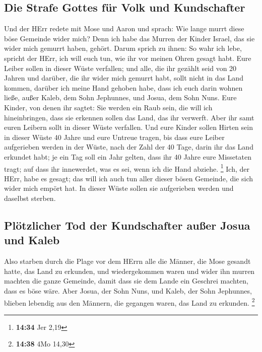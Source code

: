 \hypertarget{die-strafe-gottes-fuxfcr-volk-und-kundschafter}{%
\subsection{Die Strafe Gottes für Volk und
Kundschafter}\label{die-strafe-gottes-fuxfcr-volk-und-kundschafter}}

 Und der HErr redete mit Mose und Aaron und sprach:
 Wie lange murrt diese böse Gemeinde wider mich? Denn ich
habe das Murren der Kinder Israel, das sie wider mich gemurrt haben,
gehört.  Darum sprich zu ihnen: So wahr ich lebe, spricht
der HErr, ich will euch tun, wie ihr vor meinen Ohren gesagt habt.
 Eure Leiber sollen in dieser Wüste verfallen; und alle,
die ihr gezählt seid von 20 Jahren und darüber, die ihr wider mich
gemurrt habt,  sollt nicht in das Land kommen, darüber
ich meine Hand gehoben habe, dass ich euch darin wohnen ließe, außer
Kaleb, dem Sohn Jephunnes, und Josua, dem Sohn Nuns. 
Eure Kinder, von denen ihr sagtet: Sie werden ein Raub sein, die will
ich hineinbringen, dass sie erkennen sollen das Land, das ihr verwerft.
 Aber ihr samt euren Leibern sollt in dieser Wüste
verfallen.  Und eure Kinder sollen Hirten sein in dieser
Wüste 40 Jahre und eure Untreue tragen, bis dass eure Leiber aufgerieben
werden in der Wüste,  nach der Zahl der 40 Tage, darin
ihr das Land erkundet habt; je ein Tag soll ein Jahr gelten, dass ihr 40
Jahre eure Missetaten tragt; auf dass ihr innewerdet, was es sei, wenn
ich die Hand abziehe. \footnote{\textbf{14:34} Jer 2,19} 
Ich, der HErr, habe es gesagt; das will ich auch tun aller dieser bösen
Gemeinde, die sich wider mich empört hat. In dieser Wüste sollen sie
aufgerieben werden und daselbst sterben.

\hypertarget{pluxf6tzlicher-tod-der-kundschafter-auuxdfer-josua-und-kaleb}{%
\subsection{Plötzlicher Tod der Kundschafter außer Josua und
Kaleb}\label{pluxf6tzlicher-tod-der-kundschafter-auuxdfer-josua-und-kaleb}}

 Also starben durch die Plage vor dem HErrn alle die
Männer, die Mose gesandt hatte, das Land zu erkunden, und wiedergekommen
waren und wider ihn murren machten die ganze Gemeinde, 
damit dass sie dem Lande ein Geschrei machten, dass es böse wäre.
 Aber Josua, der Sohn Nuns, und Kaleb, der Sohn
Jephunnes, blieben lebendig aus den Männern, die gegangen waren, das
Land zu erkunden. \footnote{\textbf{14:38} 4Mo 14,30}

